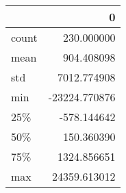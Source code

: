 \begin{tabular}{lr}
\toprule
{} &             0 \\
\midrule
count &    230.000000 \\
mean  &    904.408098 \\
std   &   7012.774908 \\
min   & -23224.770876 \\
25\%   &   -578.144642 \\
50\%   &    150.360390 \\
75\%   &   1324.856651 \\
max   &  24359.613012 \\
\bottomrule
\end{tabular}
